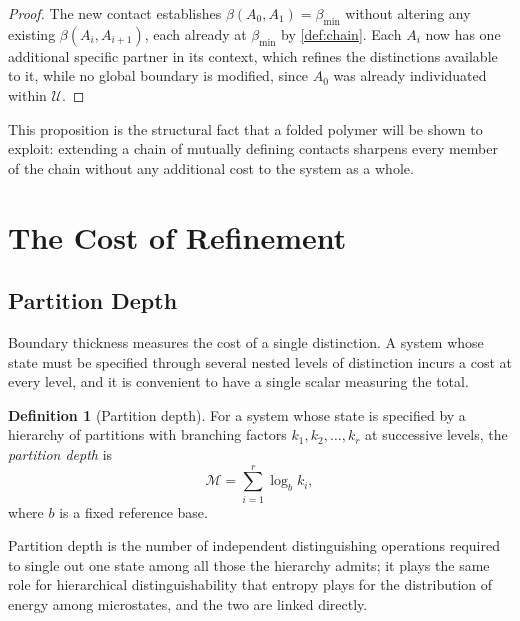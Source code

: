 \documentclass[11pt,twocolumn,a4paper]{article}
\theoremstyle{plain}
\theoremstyle{definition}
\newtheorem{definition}[theorem]{Definition}
\theoremstyle{remark}
\newcommand{\Univ}{\mathcal{U}}
\newcommand{\thick}{\beta}
\newcommand{\floor}{\thick_{\min}}
\newcommand{\Depth}{\mathcal{M}}
\begin{document}
\begin{proof}
The new contact establishes $\thick(A_0,A_1) = \floor$ without altering any
existing $\thick(A_i,A_{i+1})$, each already at $\floor$ by
\cref{def:chain}. Each $A_i$ now has one additional specific partner in its
context, which refines the distinctions available to it, while no global
boundary is modified, since $A_0$ was already individuated within $\Univ$.
\end{proof}

This proposition is the structural fact that a folded polymer will be shown
to exploit: extending a chain of mutually defining contacts sharpens every
member of the chain without any additional cost to the system as a whole.

\section{The Cost of Refinement}
\label{sec:depth}

\subsection{Partition Depth}

Boundary thickness measures the cost of a single distinction. A system
whose state must be specified through several nested levels of distinction
incurs a cost at every level, and it is convenient to have a single scalar
measuring the total.

\begin{definition}[Partition depth]
\label{def:depth}
For a system whose state is specified by a hierarchy of partitions with
branching factors $k_1, k_2, \ldots, k_r$ at successive levels, the
\emph{partition depth} is
\begin{equation}
\Depth = \sum_{i=1}^{r} \log_b k_i,
\label{eq:depth}
\end{equation}
where $b$ is a fixed reference base.
\end{definition}

Partition depth is the number of independent distinguishing operations
required to single out one state among all those the hierarchy admits; it
plays the same role for hierarchical distinguishability that entropy plays
for the distribution of energy among microstates, and the two are linked
directly.
\end{document}
